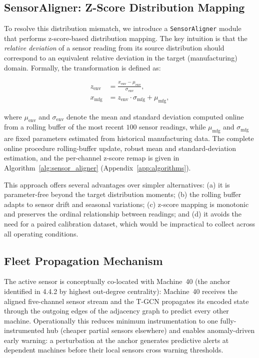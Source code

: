\subsection{SensorAligner: Z-Score Distribution Mapping}
To resolve this distribution mismatch, we introduce a \texttt{SensorAligner} module that performs z-score-based distribution mapping. The key intuition is that the \emph{relative deviation} of a sensor reading from its source distribution should correspond to an equivalent relative deviation in the target (manufacturing) domain. Formally, the transformation is defined as:

\begin{align}
z_{\text{env}} &= \frac{x_{\text{env}} - \mu_{\text{env}}}{\sigma_{\text{env}}}, \\
x_{\text{mfg}} &= z_{\text{env}} \cdot \sigma_{\text{mfg}} + \mu_{\text{mfg}},
\end{align}

where $\mu_{\text{env}}$ and $\sigma_{\text{env}}$ denote the mean and standard deviation computed online from a rolling buffer of the most recent $100$ sensor readings, while $\mu_{\text{mfg}}$ and $\sigma_{\text{mfg}}$ are fixed parameters estimated from historical manufacturing data. The complete online procedure rolling-buffer update, robust mean and standard-deviation estimation, and the per-channel z-score remap is given in Algorithm~\ref{alg:sensor_aligner} (Appendix~\ref{app:algorithms}).

This approach offers several advantages over simpler alternatives: (a) it is parameter-free beyond the target distribution moments; (b) the rolling buffer adapts to sensor drift and seasonal variations; (c) z-score mapping is monotonic and preserves the ordinal relationship between readings; and (d) it avoids the need for a paired calibration dataset, which would be impractical to collect across all operating conditions.

\subsection{Fleet Propagation Mechanism}
The active sensor is conceptually co-located with Machine~40 (the anchor identified in 4.4.2 by highest out-degree centrality): Machine~40 receives the aligned five-channel sensor stream and the T-GCN propagates its encoded state through the outgoing edges of the adjacency graph to predict every other machine. Operationally this reduces minimum instrumentation to one fully-instrumented hub (cheaper partial sensors elsewhere) and enables anomaly-driven early warning: a perturbation at the anchor generates predictive alerts at dependent machines before their local sensors cross warning thresholds.


